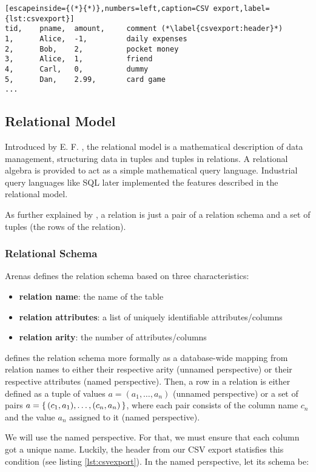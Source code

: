 \begin{lstlisting}[escapeinside={(*}{*)},numbers=left,caption=CSV export,label={lst:csvexport}]
tid,    pname,  amount,     comment (*\label{csvexport:header}*)
1,      Alice,  -1,         daily expenses
2,      Bob,    2,          pocket money
3,      Alice,  1,          friend
4,      Carl,   0,          dummy
5,      Dan,    2.99,       card game
...
\end{lstlisting}


\subsection{Relational Model}

Introduced by E. F. \cite{Codd70}, the relational model is a mathematical
description of data management, structuring data in tuples and tuples
in relations. A relational algebra is provided to act as a simple
mathematical query language. Industrial query languages
like SQL later implemented the features described in the relational model.

As further explained by \cite{Aren22}, a relation
is just a pair of a relation schema and a set of tuples (the rows of the relation).

\subsubsection{Relational Schema}
Arenas defines the relation schema based on three characteristics:
\begin{itemize}
    \item \textbf{relation name}: the name of the table
    \item \textbf{relation attributes}: a list of uniquely identifiable attributes/columns
    \item \textbf{relation arity}: the number of attributes/columns
\end{itemize}
\cite{Schw10} defines the relation schema more formally as a database-wide mapping
from relation names to either their respective arity (unnamed perspective) or
their respective attributes (named perspective). Then, a row in a relation
is either defined as a tuple of values $a = (a_1,\dots, a_n)$ (unnamed perspective) or
a set of pairs $a = \set{(c_1, a_1),\dots, (c_n, a_n)}$, where each pair consists of
the column name $c_n$ and the value $a_n$ assigned to it (named perspective).

We will use the named perspective. For that, we must ensure that each column
got a unique name. Luckily, the header from our CSV export statisfies this condition
(see listing \ref{lst:csvexport}). In the named perspective, let its schema be:


